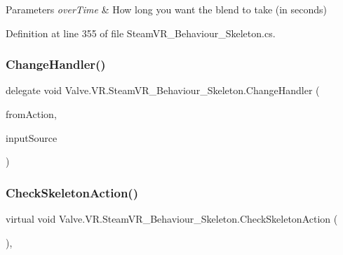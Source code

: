 \begin{DoxyParams}{Parameters}
{\em over\+Time} & How long you want the blend to take (in seconds)\\
\hline
\end{DoxyParams}


Definition at line 355 of file Steam\+V\+R\+\_\+\+Behaviour\+\_\+\+Skeleton.\+cs.

\mbox{\label{class_valve_1_1_v_r_1_1_steam_v_r___behaviour___skeleton_ab2e28cae75fa463e2dcbeccd01607c48}} 
\subsubsection{\texorpdfstring{ChangeHandler()}{ChangeHandler()}}
{\footnotesize\ttfamily delegate void Valve.\+V\+R.\+Steam\+V\+R\+\_\+\+Behaviour\+\_\+\+Skeleton.\+Change\+Handler (\begin{DoxyParamCaption}\item[{\mbox{\hyperlink{class_valve_1_1_v_r_1_1_steam_v_r___behaviour___skeleton}{Steam\+V\+R\+\_\+\+Behaviour\+\_\+\+Skeleton}}}]{from\+Action,  }\item[{\mbox{\hyperlink{namespace_valve_1_1_v_r_a82e5bf501cc3aa155444ee3f0662853f}{Steam\+V\+R\+\_\+\+Input\+\_\+\+Sources}}}]{input\+Source }\end{DoxyParamCaption})}

\mbox{\label{class_valve_1_1_v_r_1_1_steam_v_r___behaviour___skeleton_a7a2e6a9ca4acbc2c592a9afe754b3c64}} 
\subsubsection{\texorpdfstring{CheckSkeletonAction()}{CheckSkeletonAction()}}
{\footnotesize\ttfamily virtual void Valve.\+V\+R.\+Steam\+V\+R\+\_\+\+Behaviour\+\_\+\+Skeleton.\+Check\+Skeleton\+Action (\begin{DoxyParamCaption}{ }\end{DoxyParamCaption})\hspace{0.3cm}{\ttfamily [protected]}, {\ttfamily [virtual]}}



